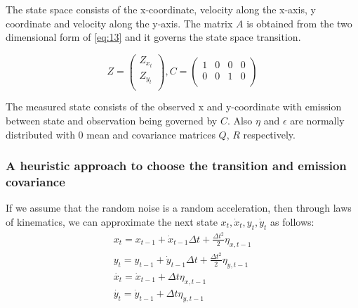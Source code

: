 \documentclass{article}
\begin{document}
The state space consists of the x-coordinate, velocity along the x-axis, y coordinate and velocity along the y-axis. The matrix $A$ is obtained from the two dimensional form of \ref{eq:13} and it governs the state space transition. 

$$
Z=\begin{pmatrix}
Z_{x_{t}}\\
Z_{y_{t}}\\
\end{pmatrix}, 
C=\begin{pmatrix} 1 & 0 & 0 & 0\\
0 & 0 & 1 & 0\\
\end{pmatrix}
$$ 

The measured state consists of the observed x and y-coordinate with emission between state and observation being governed by $C$. 
Also $\eta$ and $\epsilon$ are normally distributed with 0 mean and covariance matrices $Q$, $R$ respectively. 



\subsubsection{A heuristic approach to choose the transition and emission covariance}\label{ssec:heuristic_Q_R}
If we assume that the random noise is a random acceleration, then through laws of kinematics, we can approximate the next state $x_t, \dot{x}_t, y_t, \dot{y}_t  $ as follows:
\begin{equation}\label{eq:16}
    \begin{split}
        x_t=x_{t-1}+\dot{x}_{t-1}\Delta t +\frac{\Delta t^2}{2}\eta_{x,t-1}\\
        y_t=y_{t-1}+\dot{y}_{t-1}\Delta t +\frac{\Delta t^2}{2}\eta_{y,t-1}\\
        \dot{x_t}=\dot{x}_{t-1} + \Delta t \eta_{x,t-1}\\
        \dot{y_t}=\dot{y}_{t-1} + \Delta t \eta_{y,t-1}
    \end{split}
\end{equation}
\end{document}
